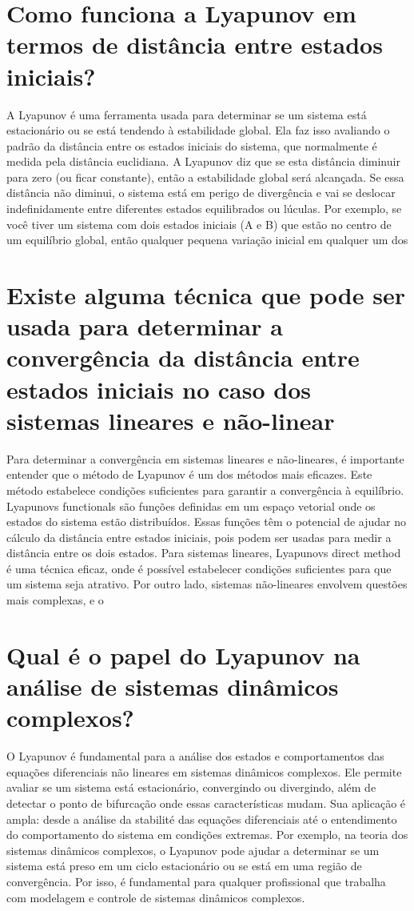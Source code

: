 \documentclass[11pt,a4paper]{article}
\begin{document}
\section{Como funciona a Lyapunov em termos de distância entre estados iniciais?}
A Lyapunov é uma ferramenta usada para determinar se um sistema está estacionário ou se está tendendo à estabilidade global. Ela faz isso avaliando o padrão da distância entre os estados iniciais do sistema, que normalmente é medida pela distância euclidiana. A Lyapunov diz que se esta distância diminuir para zero (ou ficar constante), então a estabilidade global será alcançada. Se essa distância não diminui, o sistema está em perigo de divergência e vai se deslocar indefinidamente entre diferentes estados equilibrados ou lúculas. Por exemplo, se você tiver um sistema com dois estados iniciais (A e B) que estão no centro de um equilíbrio global, então qualquer pequena variação inicial em qualquer um dos

\section{Existe alguma técnica que pode ser usada para determinar a convergência da distância entre estados iniciais no caso dos sistemas lineares e não-linear}
Para determinar a convergência em sistemas lineares e não-lineares, é importante entender que o método de Lyapunov é um dos métodos mais eficazes. Este método estabelece condições suficientes para garantir a convergência à equilíbrio. Lyapunovs functionals são funções definidas em um espaço vetorial onde os estados do sistema estão distribuídos. Essas funções têm o potencial de ajudar no cálculo da distância entre estados iniciais, pois podem ser usadas para medir a distância entre os dois estados. Para sistemas lineares, Lyapunovs direct method é uma técnica eficaz, onde é possível estabelecer condições suficientes para que um sistema seja atrativo. Por outro lado, sistemas não-lineares envolvem questões mais complexas, e o

\section{Qual é o papel do Lyapunov na análise de sistemas dinâmicos complexos?}
O Lyapunov é fundamental para a análise dos estados e comportamentos das equações diferenciais não lineares em sistemas dinâmicos complexos. Ele permite avaliar se um sistema está estacionário, convergindo ou divergindo, além de detectar o ponto de bifurcação onde essas características mudam. Sua aplicação é ampla: desde a análise da stabilité das equações diferenciais até o entendimento do comportamento do sistema em condições extremas. Por exemplo, na teoria dos sistemas dinâmicos complexos, o Lyapunov pode ajudar a determinar se um sistema está preso em um ciclo estacionário ou se está em uma região de convergência. Por isso, é fundamental para qualquer profissional que trabalha com modelagem e controle de sistemas dinâmicos complexos.
\end{document}
